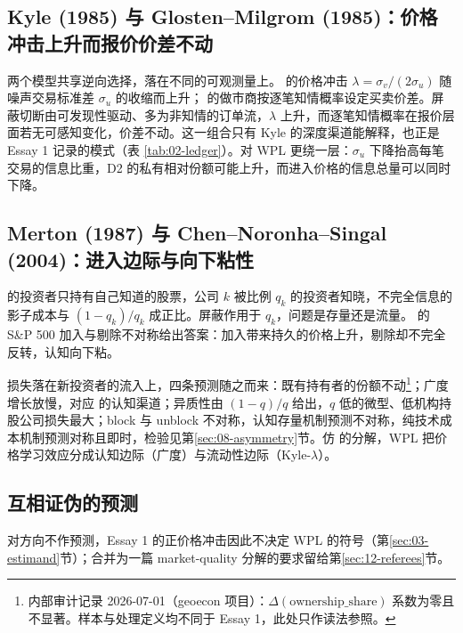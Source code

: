 \documentclass[a4paper,11pt]{ctexart}
\begin{document}
\subsection{Kyle (1985) 与 Glosten--Milgrom (1985)：价格冲击上升而报价价差不动}\label{sec:04-kyle}

两个模型共享逆向选择，落在不同的可观测量上。\citet{kyle1985} 的价格冲击 $\lambda=\sigma_v/(2\sigma_u)$ 随噪声交易标准差 $\sigma_u$ 的收缩而上升；\citet{glostenmilgrom1985} 的做市商按逐笔知情概率设定买卖价差。屏蔽切断由可发现性驱动、多为非知情的订单流，$\lambda$ 上升，而逐笔知情概率在报价层面若无可感知变化，价差不动。这一组合只有 Kyle 的深度渠道能解释，也正是 Essay 1 记录的模式（表 \ref{tab:02-ledger}）。对 WPL 更绕一层：$\sigma_u$ 下降抬高每笔交易的信息比重，D2 的私有相对份额可能上升，而进入价格的信息总量可以同时下降。

\subsection{Merton (1987) 与 Chen--Noronha--Singal (2004)：进入边际与向下粘性}\label{sec:04-merton}

\citet{merton1987} 的投资者只持有自己知道的股票，公司 $k$ 被比例 $q_k$ 的投资者知晓，不完全信息的影子成本与 $(1-q_k)/q_k$ 成正比。屏蔽作用于 $q_k$，问题是存量还是流量。\citet{chennoronhasingal2004} 的 S\&P 500 加入与剔除不对称给出答案：加入带来持久的价格上升，剔除却不完全反转，认知向下粘。

损失落在新投资者的流入上，四条预测随之而来：既有持有者的份额不动\footnote{内部审计记录 2026-07-01（geoecon 项目）：$\Delta(\text{ownership\_share})$ 系数为零且不显著。样本与处理定义均不同于 Essay 1，此处只作读法参照。}；广度增长放慢，对应 \citet{chenhongstein2002,grullonkanatasweston2004,bodnarukostberg2009} 的认知渠道；异质性由 $(1-q)/q$ 给出，$q$ 低的微型、低机构持股公司损失最大；block 与 unblock 不对称，认知存量机制预测不对称，纯技术成本机制预测对称且即时，检验见第\ref{sec:08-asymmetry}节。仿 \citet{kadlecmcconnell1994} 的分解，WPL 把价格学习效应分成认知边际（广度）与流动性边际（Kyle-$\lambda$）。

\subsection{互相证伪的预测}\label{sec:04-predictions}\label{sec:04-dp}

\citet{davilaparlatore2021} 对方向不作预测，Essay 1 的正价格冲击因此不决定 WPL 的符号（第\ref{sec:03-estimand}节）；合并为一篇 market-quality 分解的要求留给第\ref{sec:12-referees}节。
\end{document}

